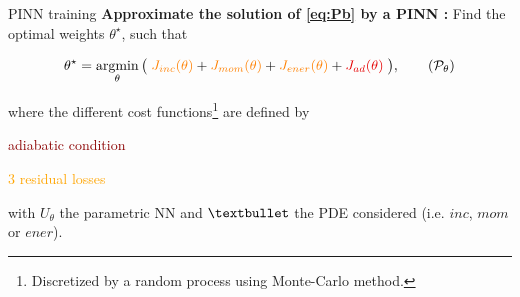 \begin{appendixframe}{PINN training}
    \vspace{-4pt}
    \textbf{Approximate the solution of \eqref{eq:Pb} by a PINN :} Find the optimal weights $\theta^\star$, such that
	
    \vspace{-8pt}
    \begin{equation}
		\theta^\star = \argmin_{\theta}	\big( \; \textcolor{orange}{J_{inc}(\theta)} + \textcolor{orange}{J_{mom}(\theta)} + \textcolor{orange}{J_{ener}(\theta)} + \textcolor{darkred}{J_{ad}(\theta)} \; \big),
		\tag{$\mathcal{P}_\theta$}
	\end{equation}

    \vspace{-2pt}
	where the different cost functions\footnote[frame,1]{Discretized by a random process using Monte-Carlo method.} are defined by
	\vspace{5pt}

	\begin{minipage}{0.24\linewidth}
		\centering
		\textcolor{darkred}{adiabatic condition}
        
		\vspace{12pt}
		\textcolor{orange}{$3$ residual losses}
	\end{minipage}
	\begin{minipage}{0.68\linewidth}
		\centering
        
        \vspace{3pt}
	\end{minipage}
    
    \vspace{5pt}
    with $U_\theta$ the parametric NN and $\textbullet$ the PDE considered (i.e. $inc$, $mom$ or $ener$).

    

\end{appendixframe}
